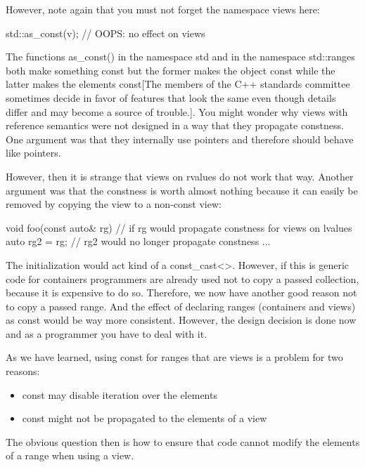 However, note again that you must not forget the namespace views here:

\begin{cpp}
std::as_const(v); // OOPS: no effect on views
\end{cpp}

The functions as\_const() in the namespace std and in the namespace std::ranges both make something const but the former makes the object const while the latter makes the elements const[The members of the C++ standards committee sometimes decide in favor of features that look the same even though details differ and may become a source of trouble.]. You might wonder why views with reference semantics were not designed in a way that they propagate constness. One argument was that they internally use pointers and therefore should behave like pointers.

However, then it is strange that views on rvalues do not work that way. Another argument was that the constness is worth almost nothing because it can easily be removed by copying the view to a non-const view:

\begin{cpp}
void foo(const auto& rg) // if rg would propagate constness for views on lvalues
{
	auto rg2 = rg; // rg2 would no longer propagate constness
	...
}
\end{cpp}

The initialization would act kind of a const\_cast<>. However, if this is generic code for containers programmers are already used not to copy a passed collection, because it is expensive to do so. Therefore, we now have another good reason not to copy a passed range. And the effect of declaring ranges (containers and views) as const would be way more consistent. However, the design decision is done now and as a programmer you have to deal with it.


As we have learned, using const for ranges that are views is a problem for two reasons:

\begin{itemize}
\item
const may disable iteration over the elements

\item
const might not be propagated to the elements of a view
\end{itemize}

The obvious question then is how to ensure that code cannot modify the elements of a range when using a view.

